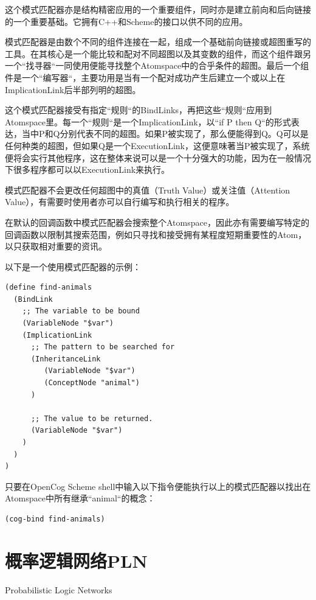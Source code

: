 这个模式匹配器亦是结构精密应用的一个重要组件，同时亦是建立前向和后向链接的一个重要基础。它拥有C++和Scheme的接口以供不同的应用。

模式匹配器是由数个不同的组件连接在一起，组成一个基础前向链接或超图重写的工具。在其核心是一个能比较和配对不同超图以及其变数的组件，而这个组件跟另一个“找寻器“一同使用便能寻找整个Atomspace中的合乎条件的超图。最后一个组件是一个“编写器“，主要功用是当有一个配对成功产生后建立一个或以上在ImplicationLink后半部列明的超图。

这个模式匹配器接受有指定“规则“的BindLinks，再把这些“规则“应用到Atomspace里。每一个“规则“是一个ImplicationLink，以“if P then Q“的形式表达，当中P和Q分别代表不同的超图。如果P被实现了，那么便能得到Q。Q可以是任何种类的超图，但如果Q是一个ExecutionLink，这便意味著当P被实现了，系统便将会实行其他程序，这在整体来说可以是一个十分强大的功能，因为在一般情况下很多程序都可以以ExecutionLink来执行。

模式匹配器不会更改任何超图中的真值（Truth Value）或关注值（Attention Value），有需要时使用者亦可以自行编写和执行相关的程序。

在默认的回调函数中模式匹配器会搜索整个Atomspace，因此亦有需要编写特定的回调函数以限制其搜索范围，例如只寻找和接受拥有某程度短期重要性的Atom，以只获取相对重要的资讯。

以下是一个使用模式匹配器的示例：

\begin{verbatim}
(define find-animals
  (BindLink
    ;; The variable to be bound
    (VariableNode "$var")
    (ImplicationLink
      ;; The pattern to be searched for
      (InheritanceLink
         (VariableNode "$var")
         (ConceptNode "animal")
      )
 
      ;; The value to be returned.
      (VariableNode "$var")
    )
  )
)
 \end{verbatim}
 
只要在OpenCog Scheme shell中输入以下指令便能执行以上的模式匹配器以找出在Atomspace中所有继承“animal“的概念：

\begin{verbatim}
(cog-bind find-animals)
\end{verbatim}


\section{概率逻辑网络PLN}{Probabilistic Logic Networks}
\label{sec:pln}


